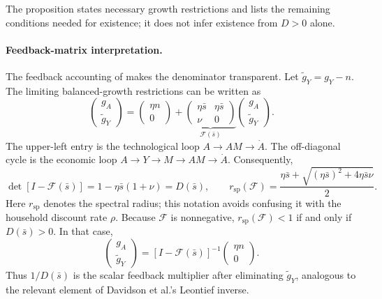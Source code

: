 The proposition states necessary growth restrictions and lists the remaining
conditions needed for existence; it does not infer existence from \(D>0\) alone.

\paragraph{Feedback-matrix interpretation.}
The feedback accounting of \citet{davidsonetal2026} makes the denominator
transparent. Let \(\widetilde g_Y=g_Y-n\). The limiting balanced-growth
restrictions can be written as
\begin{equation}
 \begin{pmatrix}g_A\\ \widetilde g_Y\end{pmatrix}
 =
 \begin{pmatrix}\eta n\\0\end{pmatrix}
 +
 \underbrace{\begin{pmatrix}
  \eta\bar s&\eta\bar s\\
  \nu&0
 \end{pmatrix}}_{\mathcal F(\bar s)}
 \begin{pmatrix}g_A\\ \widetilde g_Y\end{pmatrix}.
 \label{eq:axm-feedback-matrix}
\end{equation}
The upper-left entry is the technological loop
\(A\to AM\to\dot A\). The off-diagonal cycle is the economic loop
\(A\to Y\to M\to AM\to\dot A\). Consequently,
\begin{equation}
 \det[I-\mathcal F(\bar s)]
 =1-\eta\bar s(1+\nu)=D(\bar s),
 \qquad
 r_{\mathrm{sp}}(\mathcal F)
 =\frac{\eta\bar s+
 \sqrt{(\eta\bar s)^2+4\eta\bar s\nu}}{2}.
 \label{eq:axm-feedback-radius}
\end{equation}
Here \(r_{\mathrm{sp}}\) denotes the spectral radius; this notation avoids
confusing it with the household discount rate \(\rho\). Because \(\mathcal F\)
is nonnegative, \(r_{\mathrm{sp}}(\mathcal F)<1\) if and only if
\(D(\bar s)>0\). In that case,
\[
 \begin{pmatrix}g_A\\ \widetilde g_Y\end{pmatrix}
 =[I-\mathcal F(\bar s)]^{-1}
 \begin{pmatrix}\eta n\\0\end{pmatrix}.
\]
Thus \(1/D(\bar s)\) is the scalar feedback multiplier after eliminating
\(\widetilde g_Y\), analogous to the relevant element of Davidson et al.'s
Leontief inverse.

